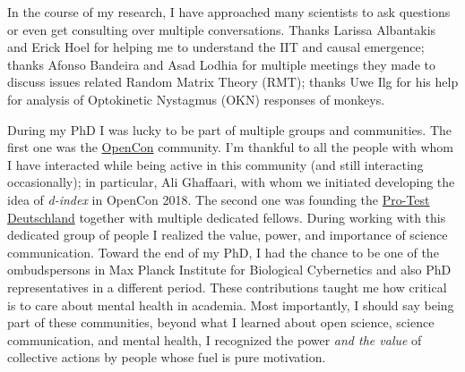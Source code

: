 In the course of my research, I have approached many scientists to ask questions or even get consulting over multiple conversations.
Thanks Larissa Albantakis and Erick Hoel for helping me to understand the IIT and causal emergence;
thanks Afonso Bandeira and Asad Lodhia for multiple meetings they made to discuss issues related Random Matrix Theory (RMT);
thanks Uwe Ilg for his help for analysis of Optokinetic Nystagmus (OKN) responses of monkeys.

During my PhD I was lucky to be part of multiple groups and communities.
The first one was the \href{https://www.opencon.community/}{OpenCon} community.
I'm thankful to all the people with whom I have interacted while being active in this community
(and still interacting occasionally);
in particular, Ali Ghaffaari, with whom we initiated developing the idea of \emph{d-index} in OpenCon 2018.
The second one was
founding the \href{http://www.pro-test-deutschland.de/}{Pro-Test Deutschland} together with multiple dedicated fellows.
During working with this dedicated group of people I realized the value, power, and importance of science communication.
Toward the end of my PhD, I had the chance to be one of the ombudspersons in Max Planck Institute for Biological Cybernetics and also PhD representatives in a different period.
These contributions taught me how critical is to care about mental health in academia.
Most importantly, I should say being part of these communities, beyond what I learned about open science, science communication, and mental health,
I recognized the power \emph{and the value} of collective actions by people whose fuel is pure motivation.


\endgroup


